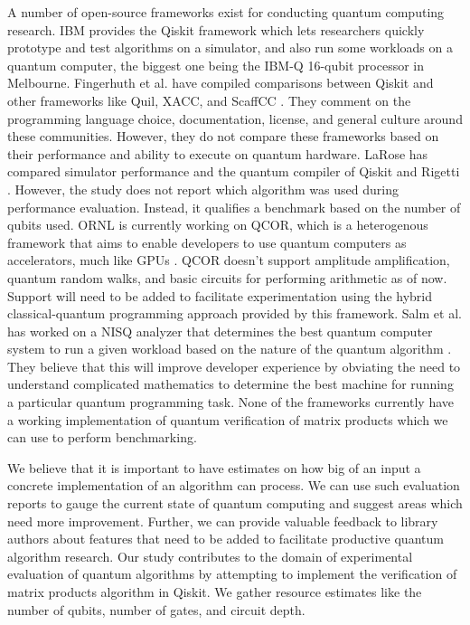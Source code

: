 \documentclass[10pt]{proc}
\theoremstyle{definition}
\theoremstyle{remark}
\begin{document}
A number of open-source frameworks exist for conducting quantum computing
research. IBM provides the Qiskit framework which lets researchers quickly
prototype and test algorithms on a simulator, and also run some workloads on a
quantum computer, the biggest one being the IBM-Q 16-qubit processor in
Melbourne. Fingerhuth et al. have compiled comparisons between Qiskit and other
frameworks like Quil, XACC, and ScaffCC \cite{fingerhuth_open_2018}. They
comment on the programming language choice, documentation, license, and general
culture around these communities. However, they do not compare these frameworks
based on their performance and ability to execute on quantum hardware. LaRose
has compared simulator performance and the quantum compiler of Qiskit and
Rigetti \cite{larose_overview_2019}.  However, the study does not report which
algorithm was used during performance evaluation. Instead, it qualifies a
benchmark based on the number of qubits used. ORNL is currently working on
QCOR, which is a heterogenous framework that aims to enable developers to use
quantum computers as accelerators, much like GPUs \cite{mintz_qcor_2020}. QCOR
doesn’t support amplitude amplification, quantum random walks, and basic
circuits for performing arithmetic as of now. Support will need to be added to
facilitate experimentation using the hybrid classical-quantum programming
approach provided by this framework. Salm et al. has worked on a NISQ analyzer
that determines the best quantum computer system to run a given workload based
on the nature of the quantum algorithm \cite{dustdar_nisq_2020}. They believe
that this will improve developer experience by obviating the need to understand
complicated mathematics to determine the best machine for running a particular
quantum programming task. None of the frameworks currently have a working
implementation of quantum verification of matrix products which we can use to
perform benchmarking.

We believe that it is important to have estimates on how big of an input a
concrete implementation of an algorithm can process. We can use such evaluation
reports to gauge the current state of quantum computing and suggest areas which
need more improvement. Further, we can provide valuable feedback to library
authors about features that need to be added to facilitate productive quantum
algorithm research. Our study contributes to the domain of experimental
evaluation of quantum algorithms by attempting to implement the verification of
matrix products algorithm in Qiskit. We gather resource estimates like
the number of qubits, number of gates, and circuit depth. 
\end{document}
